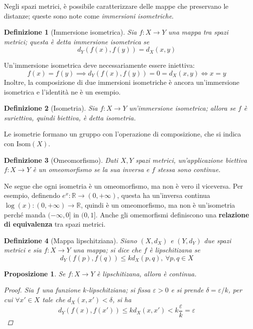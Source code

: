 \documentclass[12pt]{scrartcl}
\theoremstyle{style}
\newtheorem{definizione}{Definizione}[section]
\newtheorem{prop}{Proposizione}[section]
\numberwithin{equation}{subsection}
\renewcommand{\textbf}[1]{\textsf{\bfseries #1}}
\begin{document}
Negli spazi metrici, \`e possibile caratterizzare delle mappe che preservano le distanze; queste sono note come \textit{immersioni isometriche}.
\begin{definizione}
	[Immersione isometrica]
	Sia $f:X\to Y$ una mappa tra spazi metrici; questa \`e detta immersione isometrica se
	\[
	d_Y(f(x),f(y)) = d_X(x,y)
	\] 
\end{definizione}
\noindent Un'immersione isometrica deve necessariamente essere iniettiva:
\[
f(x) = f(y) \implies d_Y(f(x),f(y))= 0 = d_X(x,y) \iff x=  y 
\] 
Inoltre, la composizione di due immersioni isometriche \`e ancora un'immersione isometrica e l'identit\`a ne \`e un esempio.
\begin{definizione}
	[Isometria]
	Sia $f:X\to Y$ un'immersione isometrica; allora se $f$ \`e suriettiva, quindi biettiva, \`e detta \textit{isometria}.
\end{definizione}
\noindent Le isometrie formano un gruppo con l'operazione di composizione, che si indica con $\mathrm{Isom} (X)$.
\begin{definizione}
	[Omeomorfismo]
	Dati $X,Y$ spazi metrici, un'applicazione biettiva $f:X\to Y$ \`e un \textit{omeomorfismo} se la sua inversa e $f$ stessa sono continue.
\end{definizione}
\noindent Ne segue che ogni isometria \`e un omeomorfismo, ma non \`e vero il viceversa. Per esempio, definendo $e^x : \mathbb{R} \to (0,+\infty)$, questa ha un'inversa continua $\log(x) : (0,+\infty) \to \mathbb{R}$, quindi \`e un omeomorfismo, ma non \`e un'isometria perch\'e manda $(-\infty,0]$ in $(0,1]$.
Anche gli omemorfismi definiscono una \textbf{relazione di equivalenza} tra spazi metrici.
\begin{definizione}
	[Mappa lipschitziana]
	Siano $(X,d_X)$ e $(Y,d_Y)$ due spazi metrici e sia $f : X \to Y$ una mappa; si dice che $f$ \`e \textit{lipschitizana} se 
	\[
	d_Y(f(p),f(q)) \le kd_X(p,q) ,\ \forall p,q \in X
	\] 
\end{definizione}
\begin{prop}
	Se $f:X\to Y$ \`e lipschitizana, allora \`e continua.
	\begin{proof}
		Sia $f$ una funzione $k$-lipschitziana; si fissa $\varepsilon > 0 $ e si prende $\delta = \varepsilon / k$, per cui $\forall x' \in X$ tale che $d_X (x,x') < \delta $, si ha
		\[
		d_Y(f(x),f(x')) \le k d_X(x,x') < k \frac{ \varepsilon}{k}  = \varepsilon 
		\] 
		
	\end{proof}
\end{prop}
\end{document}
